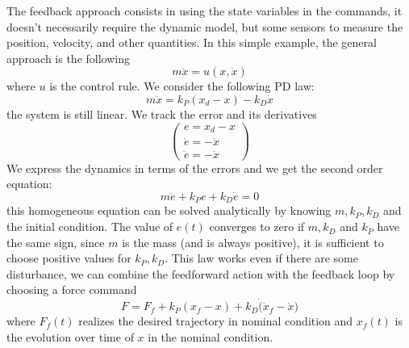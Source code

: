 \documentclass[10pt, a4paper]{report}
\begin{document}
The feedback approach consists in using the state variables in the commands, it doesn't necessarily  require the dynamic model, but some sensors to measure the position, velocity, and other quantities. In this simple example, the general approach is the following\begin{equation}
    m\ddot x = u(x,\dot x)
\end{equation}
where $u$ is the control rule. We consider the following PD law:\begin{equation}
    m\ddot x=k_P(x_d-x)-k_D \dot x
\end{equation}
the system is still linear. We track the error and its derivatives\begin{equation}
    \begin{pmatrix}
        e=x_d-x\\ 
        \dot e = -\dot x\\ 
        \ddot e = -\ddot x
    \end{pmatrix}
\end{equation}
We express the dynamics in terms of the errors and we get the second order equation:\begin{equation}
    m\ddot e+k_Pe+k_D\dot e = 0
\end{equation}
this homogeneous equation can be solved analytically by knowing $m,k_P,k_D$ and the initial condition. The value of $e(t)$ converges to zero if $m,k_D$ and $k_P$ have the same sign, since $m$ is the mass (and is always positive), it is sufficient to choose positive values for $k_P,k_D$. This law works even if there are some disturbance, we can combine the feedforward action with the feedback loop by choosing a force command\begin{equation}
    F=F_f+k_P(x_f-x)+k_D \dot (\dot x_f-\dot x)
\end{equation}
where $F_f(t)$ realizes the desired trajectory in nominal condition and $x_f(t)$ is the evolution over time of $x$ in the nominal condition.\bigskip
\end{document}
